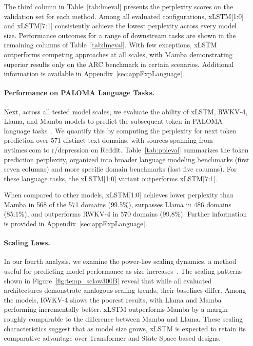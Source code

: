 The third column in Table~\ref{tab:lmeval} presents the perplexity scores on the validation set for each method. Among all evaluated configurations, xLSTM[1:0] and xLSTM[7:1] consistently achieve the lowest perplexity across every model size. Performance outcomes for a range of downstream tasks are shown in the remaining columns of Table~\ref{tab:lmeval}. With few exceptions, xLSTM outperforms competing approaches at all scales, with Mamba demonstrating superior results only on the ARC benchmark in certain scenarios. Additional information is available in Appendix~\ref{sec:appExpLanguage}.

\paragraph{Performance on PALOMA Language Tasks.} Next, across all tested model scales, we evaluate the ability of xLSTM, RWKV-4, Llama, and Mamba models to predict the subsequent token in PALOMA language tasks~\citep{Magnusson:23arxivshort}. We quantify this by computing the perplexity for next token prediction over 571 distinct text domains, with sources spanning from nytimes.com to r/depression on Reddit.
Table~\ref{tab:ppleval} summarizes the token prediction perplexity, organized into broader language modeling benchmarks (first seven columns) and more specific domain benchmarks (last five columns). For these language tasks, the xLSTM[1:0] variant outperforms xLSTM[7:1].

When compared to other models, xLSTM[1:0] achieves lower perplexity than Mamba in 568 of the 571 domains (99.5\%), surpasses Llama in 486 domains (85.1\%), and outperforms RWKV-4 in 570 domains (99.8\%). Further information is provided in Appendix~\ref{sec:appExpLanguage}.

\paragraph{Scaling Laws.} In our fourth analysis, we examine the power-law scaling dynamics, a method useful for predicting model performance as size increases~\citep{Kaplan:20,Brown:20short}. The scaling patterns shown in Figure~\ref{fig:temp_sclaw300B} reveal that while all evaluated architectures demonstrate analogous scaling trends, their baselines differ. Among the models, RWKV-4 shows the poorest results, with Llama and Mamba performing incrementally better. xLSTM outperforms Mamba by a margin roughly comparable to the difference between Mamba and Llama. These scaling characteristics suggest that as model size grows, xLSTM is expected to retain its comparative advantage over Transformer and State-Space based designs.

